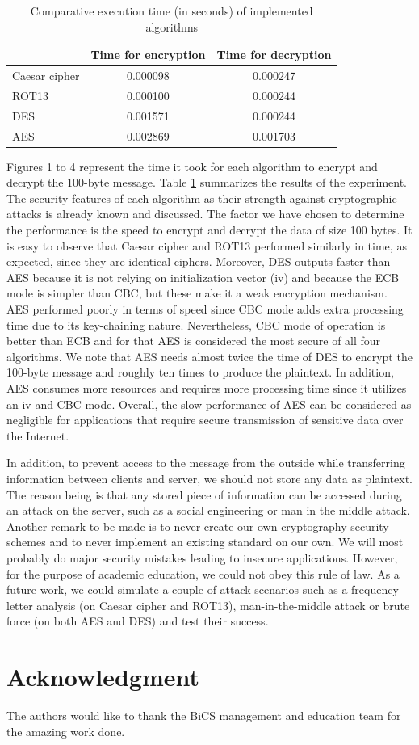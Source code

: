 \begin{table}[h!]
\begin{tabular}{|l|c|c|}
\hline
\multicolumn{1}{|c|}{} & Time for encryption & \multicolumn{1}{l|}{Time for decryption} \\ \hline
Caesar cipher & 0.000098 & 0.000247 \\ \hline
ROT13 & 0.000100 & 0.000244 \\ \hline
DES & 0.001571 & 0.000244 \\ \hline
AES & 0.002869 & 0.001703 \\ \hline
\end{tabular}
\caption{Comparative execution time (in seconds) of implemented algorithms}
\label{results}
\end{table}


Figures 1 to 4 represent the time it took for each algorithm to encrypt and decrypt the 100-byte message. Table \ref{results} summarizes the results of the experiment. The security features of each algorithm as their strength against cryptographic attacks is already known and discussed. The factor we have chosen to determine the performance is the speed to encrypt and decrypt the data of size 100 bytes. It is easy to observe that Caesar cipher and ROT13 performed similarly in time, as expected, since they are identical ciphers. Moreover, DES outputs faster than AES because it is not relying on initialization vector (iv) and because the ECB mode is simpler than CBC, but these make it a weak encryption mechanism. AES performed poorly in terms of speed since CBC mode adds extra processing time due to its key-chaining nature. Nevertheless, CBC mode of operation is better than ECB and for that AES is considered the most secure of all four algorithms. We note that AES needs almost twice the time of DES to encrypt the 100-byte message and roughly ten times to produce the plaintext. In addition, AES consumes more resources and requires more processing time since it utilizes an iv and CBC mode. Overall, the slow performance of AES can be considered as negligible for applications that require secure transmission of sensitive data over the Internet.

In addition, to prevent access to the message from the outside while transferring information between clients and server, we should not store any data as plaintext. The reason being is that any stored piece of information can be accessed during an attack on the server, such as a social engineering or man in the middle attack. Another remark to be made is to never create our own cryptography security schemes and to never implement an existing standard on our own. We will most probably do major security mistakes leading to insecure applications. However, for the purpose of academic education, we could not obey this rule of law. 
As a future work, we could simulate a couple of attack scenarios such as a frequency letter analysis (on Caesar cipher and ROT13), man-in-the-middle attack or brute force (on both AES and DES) and test their success. 

\section*{Acknowledgment}
The authors would like to thank the BiCS management and education team for the amazing work done.